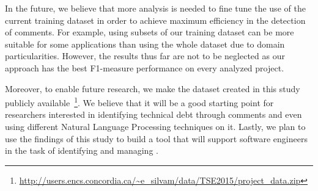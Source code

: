 In the future, we believe that more analysis is needed to fine tune the use of the current training dataset in order to achieve maximum efficiency in the detection of \SATD comments. For example, using subsets of our training dataset can be more suitable for some applications than using the whole dataset due to domain particularities. However, the results thus far are not to be neglected as our approach has the best F1-measure performance on every analyzed project.   


Moreover, to enable future research, we make the dataset created in this study publicly available~\footnote{\url{http://users.encs.concordia.ca/~e_silvam/data/TSE2015/project_data.zip}}. We believe that it will be a good starting point for researchers interested in identifying technical debt through comments and even using different Natural Language Processing techniques on it. Lastly, we plan to use the findings of this study to build a tool that will support software engineers in the task of identifying and managing \SATD. 


